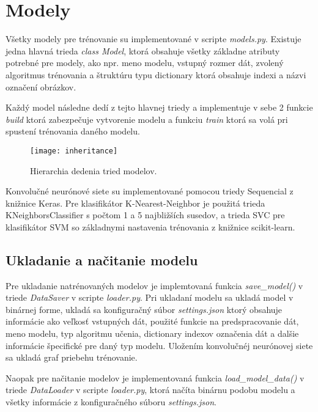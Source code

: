 
\section{Modely}
\label{sec:modely}
Všetky modely pre trénovanie su implementované v scripte \textit{models.py}.
Existuje jedna hlavná trieda \textit{class Model}, ktorá obsahuje všetky základne atributy potrebné pre modely, ako npr.
    meno modelu, vstupný rozmer dát, zvolený algoritmus trénovania a štruktúru typu dictionary ktorá obsahuje indexi a názvi označení obrázkov.

Každý model následne dedí z tejto hlavnej triedy a implementuje v sebe 2 funkcie \textit{build} ktorá zabezpečuje vytvorenie modelu a
    funkciu \textit{train} ktorá sa volá pri spustení trénovania daného modelu.

\begin{figure}[H]
    \centering
    \texttt{[image: inheritance]}
    \caption{Hierarchia dedenia tried modelov.}
    \label{pic:inheritance}
\end{figure}

Konvolučné neurónové siete su implementované pomocou triedy Sequencial z knižnice Keras.
Pre klasifikátor K-Nearest-Neighbor je použitá trieda KNeighborsClassifier s počtom 1 a 5 najbližších susedov, a trieda SVC pre klasifikátor SVM
    so základnymi nastavenia trénovania z knižnice scikit-learn.

\subsection{Ukladanie a načitanie modelu}
\label{subsec:ukladaniemodelu}
Pre ukladanie natrénovaných modelov je implemtovaná funkcia \textit{save\_model()} v triede \textit{DataSaver} v scripte \textit{loader.py}.
Pri ukladaní modelu sa ukladá model v binárnej forme, ukladá sa konfiguračný súbor \textit{settings.json} ktorý obsahuje informácie ako veľkosť
    vstupných dát, použité funkcie na predspracovanie dát, meno modelu, typ algoritmu učenia, dictionary indexov označenia dát a dalšie informácie
    špecifické pre daný typ modelu.
Uložením konvolučnéj neurónovej siete sa ukladá graf priebehu trénovanie.

Naopak pre načitanie modelov je implementovaná funkcia \textit{load\_model\_data()} v triede \textit{DataLoader} v scripte \textit{loader.py},
    ktorá načíta binárnu podobu modelu a všetky informácie z konfiguračného súboru \textit{settings.json}.
